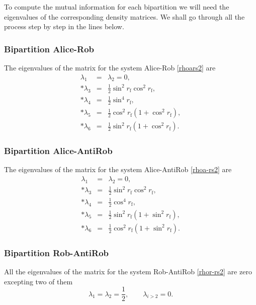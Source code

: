 To compute the mutual information  for each bipartition we will need the eigenvalues of the corresponding density matrices. We shall go through all the process step by step in the lines below.

\subsubsection{Bipartition Alice-Rob}

The eigenvalues of the matrix for the system Alice-Rob \eqref{rhoars2} are
\begin{eqnarray}\label{eigAR4m1}
\nonumber \lambda_1&=&\lambda_2=0,\\*
\nonumber \lambda_3&=&\frac12\sin^2r_\text{f}\cos^2r_\text{f},\\*
\nonumber \lambda_4&=&\frac12\sin^4r_\text{f},\\*
\nonumber \lambda_5&=&\frac12\cos^2r_\text{f}\left(1+\cos^2r_\text{f}\right),\\*
\lambda_6&=&\frac12\sin^2r_\text{f}\left(1+\cos^2r_\text{f}\right).
\end{eqnarray}

\subsubsection{Bipartition Alice-AntiRob}

The eigenvalues of the matrix for the system Alice-AntiRob \eqref{rhoa-rs2} are
\begin{eqnarray}\label{eigAaR4m1}
\nonumber \lambda_1&=&\lambda_2=0,\\*
\nonumber \lambda_3&=&\frac12\sin^2r_\text{f}\cos^2 r_\text{f},\\*
\nonumber \lambda_4&=&\frac12\cos^4 r_\text{f},\\*
\nonumber \lambda_5&=&\frac12\sin^2r_\text{f} \left(1+\sin^2 r_\text{f}\right),\\*
 \lambda_6&=&\frac12\cos^2 r_\text{f}\left(1+\sin^2 r_\text{f}\right).
\end{eqnarray}

\subsubsection{Bipartition Rob-AntiRob}

All the eigenvalues of the matrix for the system Rob-AntiRob \eqref{rhor-rs2} are zero excepting two of them
\begin{equation}\label{eigRaR4m1}
\lambda_1=\lambda_2=\frac12,\qquad \lambda_{i>2}=0.
\end{equation}

